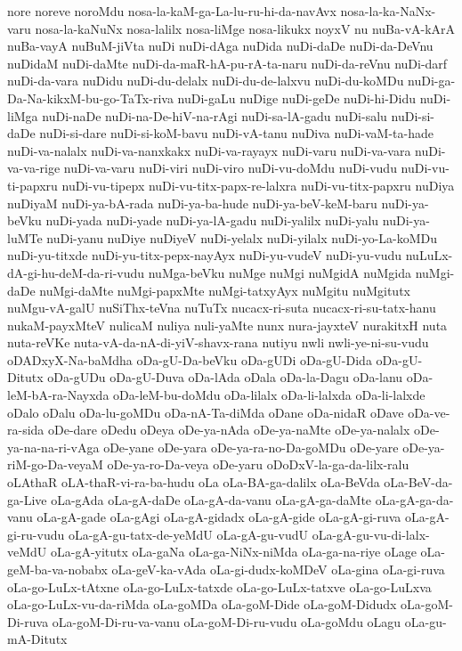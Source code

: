 {nore
noreve
noroMdu
nosa-la-kaM-ga-La-lu-ru-hi-da-navAvx
nosa-la-ka-NaNx-varu
nosa-la-kaNuNx
nosa-lalilx
nosa-liMge
nosa-likukx
noyxV
nu
nuBa-vA-kArA
nuBa-vayA
nuBuM-jiVta
nuDi
nuDi-dAga
nuDida
nuDi-daDe
nuDi-da-DeVnu
nuDidaM
nuDi-daMte
nuDi-da-maR-hA-pu-rA-ta-naru
nuDi-da-reVnu
nuDi-darf
nuDi-da-vara
nuDidu
nuDi-du-delalx
nuDi-du-de-lalxvu
nuDi-du-koMDu
nuDi-ga-Da-Na-kikxM-bu-go-TaTx-riva
nuDi-gaLu
nuDige
nuDi-geDe
nuDi-hi-Didu
nuDi-liMga
nuDi-naDe
nuDi-na-De-hiV-na-rAgi
nuDi-sa-lA-gadu
nuDi-salu
nuDi-si-daDe
nuDi-si-dare
nuDi-si-koM-bavu
nuDi-vA-tanu
nuDiva
nuDi-vaM-ta-hade
nuDi-va-nalalx
nuDi-va-nanxkakx
nuDi-va-rayayx
nuDi-varu
nuDi-va-vara
nuDi-va-va-rige
nuDi-va-varu
nuDi-viri
nuDi-viro
nuDi-vu-doMdu
nuDi-vudu
nuDi-vu-ti-papxru
nuDi-vu-tipepx
nuDi-vu-titx-papx-re-lalxra
nuDi-vu-titx-papxru
nuDiya
nuDiyaM
nuDi-ya-bA-rada
nuDi-ya-ba-hude
nuDi-ya-beV-keM-baru
nuDi-ya-beVku
nuDi-yada
nuDi-yade
nuDi-ya-lA-gadu
nuDi-yalilx
nuDi-yalu
nuDi-ya-luMTe
nuDi-yanu
nuDiye
nuDiyeV
nuDi-yelalx
nuDi-yilalx
nuDi-yo-La-koMDu
nuDi-yu-titxde
nuDi-yu-titx-pepx-nayAyx
nuDi-yu-vudeV
nuDi-yu-vudu
nuLuLx-dA-gi-hu-deM-da-ri-vudu
nuMga-beVku
nuMge
nuMgi
nuMgidA
nuMgida
nuMgi-daDe
nuMgi-daMte
nuMgi-papxMte
nuMgi-tatxyAyx
nuMgitu
nuMgitutx
nuMgu-vA-galU
nuSiThx-teVna
nuTuTx
nucacx-ri-suta
nucacx-ri-su-tatx-hanu
nukaM-payxMteV
nulicaM
nuliya
nuli-yaMte
nunx
nura-jayxteV
nurakitxH
nuta
nuta-reVKe
nuta-vA-da-nA-di-yiV-shavx-rana
nutiyu
nwli
nwli-ye-ni-su-vudu
oDADxyX-Na-baMdha
oDa-gU-Da-beVku
oDa-gUDi
oDa-gU-Dida
oDa-gU-Ditutx
oDa-gUDu
oDa-gU-Duva
oDa-lAda
oDala
oDa-la-Dagu
oDa-lanu
oDa-leM-bA-ra-Nayxda
oDa-leM-bu-doMdu
oDa-lilalx
oDa-li-lalxda
oDa-li-lalxde
oDalo
oDalu
oDa-lu-goMDu
oDa-nA-Ta-diMda
oDane
oDa-nidaR
oDave
oDa-ve-ra-sida
oDe-dare
oDedu
oDeya
oDe-ya-nAda
oDe-ya-naMte
oDe-ya-nalalx
oDe-ya-na-na-ri-vAga
oDe-yane
oDe-yara
oDe-ya-ra-no-Da-goMDu
oDe-yare
oDe-ya-riM-go-Da-veyaM
oDe-ya-ro-Da-veya
oDe-yaru
oDoDxV-la-ga-da-lilx-ralu
oLAthaR
oLA-thaR-vi-ra-ba-hudu
oLa
oLa-BA-ga-dalilx
oLa-BeVda
oLa-BeV-da-ga-Live
oLa-gAda
oLa-gA-daDe
oLa-gA-da-vanu
oLa-gA-ga-daMte
oLa-gA-ga-da-vanu
oLa-gA-gade
oLa-gAgi
oLa-gA-gidadx
oLa-gA-gide
oLa-gA-gi-ruva
oLa-gA-gi-ru-vudu
oLa-gA-gu-tatx-de-yeMdU
oLa-gA-gu-vudU
oLa-gA-gu-vu-di-lalx-veMdU
oLa-gA-yitutx
oLa-gaNa
oLa-ga-NiNx-niMda
oLa-ga-na-riye
oLage
oLa-geM-ba-va-nobabx
oLa-geV-ka-vAda
oLa-gi-dudx-koMDeV
oLa-gina
oLa-gi-ruva
oLa-go-LuLx-tAtxne
oLa-go-LuLx-tatxde
oLa-go-LuLx-tatxve
oLa-go-LuLxva
oLa-go-LuLx-vu-da-riMda
oLa-goMDa
oLa-goM-Dide
oLa-goM-Didudx
oLa-goM-Di-ruva
oLa-goM-Di-ru-va-vanu
oLa-goM-Di-ru-vudu
oLa-goMdu
oLagu
oLa-gu-mA-Ditutx
}
